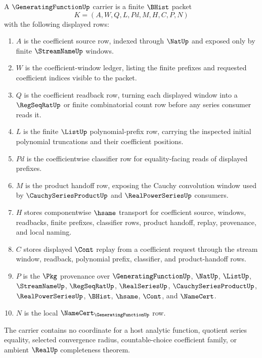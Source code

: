\begin{definition}
\label{def:generating-function-carrier}
A $\GeneratingFunctionUp$ carrier is a finite $\BHist$ packet
$$
K=(A,W,Q,L,Pd,M,H,C,P,N)
$$
with the following displayed rows:
\begin{enumerate}
\item $A$ is the coefficient source row, indexed through $\NatUp$ and exposed only by finite $\StreamNameUp$ windows.
\item $W$ is the coefficient-window ledger, listing the finite prefixes and requested coefficient indices visible to the packet.
\item $Q$ is the coefficient readback row, turning each displayed window into a $\RegSeqRatUp$ or finite combinatorial count row before any series consumer reads it.
\item $L$ is the finite $\ListUp$ polynomial-prefix row, carrying the inspected initial polynomial truncations and their coefficient positions.
\item $Pd$ is the coefficientwise classifier row for equality-facing reads of displayed prefixes.
\item $M$ is the product handoff row, exposing the Cauchy convolution window used by $\CauchySeriesProductUp$ and $\RealPowerSeriesUp$ consumers.
\item $H$ stores componentwise $\hsame$ transport for coefficient source, windows, readbacks, finite prefixes, classifier rows, product handoff, replay, provenance, and local naming.
\item $C$ stores displayed $\Cont$ replay from a coefficient request through the stream window, readback, polynomial prefix, classifier, and product-handoff rows.
\item $P$ is the $\Pkg$ provenance over $\GeneratingFunctionUp$, $\NatUp$, $\ListUp$, $\StreamNameUp$, $\RegSeqRatUp$, $\RealSeriesUp$, $\CauchySeriesProductUp$, $\RealPowerSeriesUp$, $\BHist$, $\hsame$, $\Cont$, and $\NameCert$.
\item $N$ is the local $\NameCert_{\GeneratingFunctionUp}$ row.
\end{enumerate}
The carrier contains no coordinate for a host analytic function, quotient series equality, selected convergence radius, countable-choice coefficient family, or ambient $\RealUp$ completeness theorem.
\end{definition}


